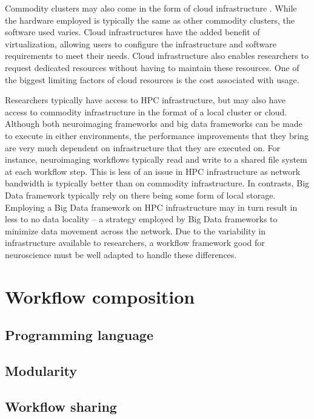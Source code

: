 \documentclass{report}
\begin{document}
            Commodity clusters may also come in the form of cloud infrastructure
            . While the hardware employed is typically the same as other
            commodity clusters, the software used varies. Cloud infrastructures
            have the added benefit of virtualization, allowing users to 
            configure the infrastructure and software requirements to meet their
            needs. Cloud infrastructure also enables researchers to request
            dedicated resources without having to maintain these resources. One
            of the biggest limiting factors of cloud resources is the cost 
            associated with usage.

            Researchers typically have access to HPC infrastructure, but may
            also have access to commodity infrastructure in the format of a 
            local cluster or cloud. Although both neuroimaging frameworks and
            big data frameworks can be made to execute in either environments,
            the performance improvements that they bring are very much 
            dependent on infrastructure that they are executed on. For instance,
            neuroimaging workflows typically read and write to a shared file
            system at each workflow step. This is less of an issue in HPC 
            infrastructure as network bandwidth is typically better than on 
            commodity infrastructure. In contrasts, Big Data framework typically
            rely on there being some form of local storage. Employing a Big Data
            framework on HPC infrastructure may in turn result in less to no 
            data locality -- a strategy employed by Big Data frameworks to 
            minimize data movement across the network. Due to the variability in
            infrastructure available to researchers, a workflow framework good
            for neuroscience must be well adapted to handle these differences.

    \chapter{Workflow composition}\label{workcomp}
        \section{Programming language}
        \section{Modularity}
        \section{Workflow sharing}
\end{document}
